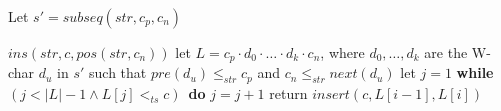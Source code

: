 {\begin{itemize}
\end{itemize}

\begin{algorithm}[t]

Let $s' = \mathit{subseq}(\mathit{str},c_p,c_n)$ \;

{
    \Return $\mathit{ins}(\mathit{str},c,\mathit{pos}(\mathit{str},c_n))$\;
}
\Else
{
    let $L = c_p \cdot d_0 \cdot \ldots \cdot d_k \cdot c_n$, where $d_0,\ldots,d_k$ are the W-char $d_u$ in $s'$ such that $\mathit{pre}(d_u) \leq_{\mathit{str}} c_p$ and $c_n \leq_{\mathit{str}} \mathit{next}(d_u)$\;
    let $j = 1$\;
    {\bf while} $(j < \vert L \vert -1 \wedge L[j] <_{\mathit{ts}} c)$\ {\bf do}
    {
        $j = j+1$\;
    }
    return $\mathit{insert}(c,L[i-1],L[i])$\;
}
\caption{$\mathit{insert}$}
\label{alg:insert}
\end{algorithm}
}










